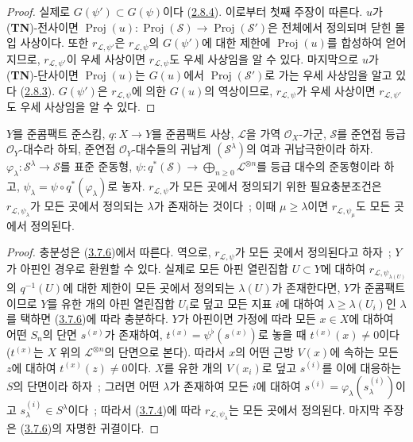 \begin{proof}
실제로 $G(\psi')\subset G(\psi)$이다
(\hyperref[II.2.8.4-ko]{2.8.4}). 이로부터 첫째 주장이 따른다. $u$가
(\textbf{TN})-전사이면
$\operatorname{Proj}(u):\operatorname{Proj}(\mathcal{S})\to
\operatorname{Proj}(\mathcal{S}')$은 전체에서 정의되며 닫힌 몰입
사상이다. 또한 $r_{\mathcal{L},\psi'}$은
$r_{\mathcal{L},\psi}$의 $G(\psi')$에 대한 제한에
$\operatorname{Proj}(u)$를 합성하여 얻어지므로,
$r_{\mathcal{L},\psi'}$이 우세 사상이면
$r_{\mathcal{L},\psi}$도 우세 사상임을 알 수 있다. 마지막으로 $u$가
(\textbf{TN})-단사이면 $\operatorname{Proj}(u)$는 $G(u)$에서
$\operatorname{Proj}(\mathcal{S}')$로 가는 우세 사상임을 알고 있다
(\hyperref[II.2.8.3-ko]{2.8.3}). $G(\psi')$은
$r_{\mathcal{L},\psi}$에 의한 $G(u)$의 역상이므로,
$r_{\mathcal{L},\psi}$가 우세 사상이면
$r_{\mathcal{L},\psi'}$도 우세 사상임을 알 수 있다.
\end{proof}

\begin{proposition}[3.7.7]
\label{II.3.7.7-ko}
$Y$를 준콤팩트 준스킴, $q:X\to Y$를 준콤팩트 사상,
$\mathcal{L}$을 가역 $\mathcal{O}_X$-가군, $\mathcal{S}$를 준연접 등급
$\mathcal{O}_Y$-대수라 하되, 준연접 $\mathcal{O}_Y$-대수들의 귀납계
$(\mathcal{S}^\lambda)$의 여과 귀납극한이라 하자.
$\varphi_\lambda:\mathcal{S}^\lambda\to\mathcal{S}$를 표준 준동형,
$\psi:q^*(\mathcal{S})\to\bigoplus_{n\geq0}\mathcal{L}^{\otimes n}$를
등급 대수의 준동형이라 하고,
$\psi_\lambda=\psi\circ q^*(\varphi_\lambda)$로 놓자.
$r_{\mathcal{L},\psi}$가 모든 곳에서 정의되기 위한 필요충분조건은
$r_{\mathcal{L},\psi_\lambda}$가 모든 곳에서 정의되는 $\lambda$가
존재하는 것이다~; 이때 $\mu\geq\lambda$이면
$r_{\mathcal{L},\psi_\mu}$도 모든 곳에서 정의된다.
\end{proposition}

\begin{proof}
충분성은 (\hyperref[II.3.7.6-ko]{3.7.6})에서 따른다. 역으로,
$r_{\mathcal{L},\psi}$가 모든 곳에서 정의된다고 하자~; $Y$가 아핀인
경우로 환원할 수 있다. 실제로 모든 아핀 열린집합 $U\subset Y$에 대하여
$r_{\mathcal{L},\psi_{\lambda(U)}}$의 $q^{-1}(U)$에 대한 제한이 모든
곳에서 정의되는 $\lambda(U)$가 존재한다면, $Y$가 준콤팩트이므로 $Y$를
유한 개의 아핀 열린집합 $U_i$로 덮고 모든 지표 $i$에 대하여
$\lambda\geq\lambda(U_i)$인 $\lambda$를 택하면
(\hyperref[II.3.7.6-ko]{3.7.6})에 따라 충분하다. $Y$가 아핀이면 가정에
따라 모든 $x\in X$에 대하여 어떤 $S_n$의 단면 $s^{(x)}$가 존재하여,
$t^{(x)}=\psi^\flat(s^{(x)})$로 놓을 때 $t^{(x)}(x)\neq0$이다
($t^{(x)}$는 $X$ 위의 $\mathcal{L}^{\otimes n}$의 단면으로 본다).
따라서 $x$의 어떤 근방 $V(x)$에 속하는 모든 $z$에 대하여
$t^{(x)}(z)\neq0$이다. $X$를 유한 개의 $V(x_i)$로 덮고 $s^{(i)}$를
이에 대응하는 $S$의 단면이라 하자~; 그러면 어떤 $\lambda$가 존재하여
모든 $i$에 대하여 $s^{(i)}=\varphi_\lambda(s_\lambda^{(i)})$이고
$s_\lambda^{(i)}\in S^\lambda$이다~; 따라서
(\hyperref[II.3.7.4-ko]{3.7.4})에 따라
$r_{\mathcal{L},\psi_\lambda}$는 모든 곳에서 정의된다. 마지막 주장은
(\hyperref[II.3.7.6-ko]{3.7.6})의 자명한 귀결이다.
\end{proof}

